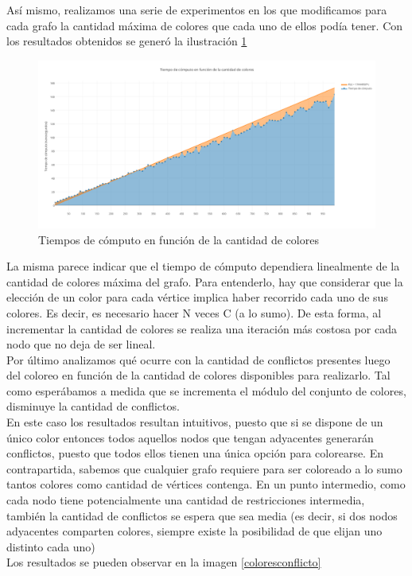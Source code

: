 Así mismo, realizamos una serie de experimentos en los que modificamos para cada grafo la cantidad máxima de colores que cada uno de ellos podía tener. Con los resultados obtenidos se generó la ilustración \ref{colorestiempo}

 \begin{figure}[H]
    \begin{center}
  	\includegraphics[width=18cm]{imagenes/Ej3/colorestiempo.png}
 	\caption{Tiempos de cómputo en función de la cantidad de colores}
 	\label{colorestiempo}
    \end{center}
  \end{figure}

La misma parece indicar que el tiempo de cómputo dependiera linealmente de la cantidad de colores máxima del grafo. Para entenderlo, hay que considerar que la elección de un color para cada vértice implica haber recorrido cada uno de sus colores. Es decir, es necesario hacer N veces C (a lo sumo). De esta forma, al incrementar la cantidad de colores se realiza una iteración más costosa por cada nodo que no deja de ser lineal.\\

Por último analizamos qué ocurre con la cantidad de conflictos presentes luego del coloreo en función de la cantidad de colores disponibles para realizarlo. Tal como esperábamos a medida que se incrementa el módulo del conjunto de colores, disminuye la cantidad de conflictos. \\
En este caso los resultados resultan intuitivos, puesto que si se dispone de un único color entonces todos aquellos nodos que tengan adyacentes generarán conflictos, puesto que todos ellos tienen una única opción para colorearse. En contrapartida, sabemos que cualquier grafo requiere para ser coloreado a lo sumo tantos colores como cantidad de vértices contenga. En un punto intermedio, como cada nodo tiene potencialmente una cantidad de restricciones intermedia, también la cantidad de conflictos se espera que sea media (es decir, si dos nodos adyacentes comparten colores, siempre existe la posibilidad de que elijan uno distinto cada uno)  \\
Los resultados se pueden observar en la imagen \ref{coloresconflicto}


